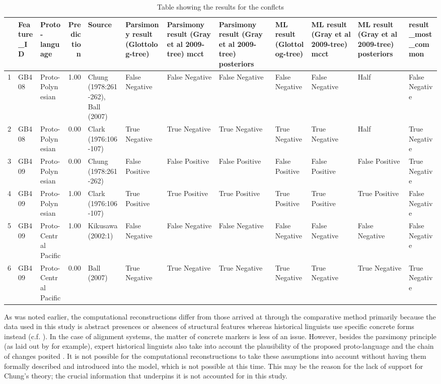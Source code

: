 \documentclass[a4paper,10pt]{article} %
\begin{document}
\begin{table}[ht]
\caption{Table showing the results for the conflcts}
\label{conflict_table}
\centering
\begin{tabular}{rllrllllllll}
  \hline
 & Feature\_ID & Proto-language & Prediction & Source & Parsimony result (Glottolog-tree) & Parsimony result (Gray et al 2009-tree) mcct & Parsimony result (Gray et al 2009-tree) posteriors & ML result (Glottolog-tree) & ML result (Gray et al 2009-tree) mcct & ML result (Gray et al 2009-tree) posteriors & result\_most\_common \\ 
  \hline
1 & GB408 & Proto-Polynesian & 1.00 & Chung (1978:261-262), Ball (2007) & False Negative & False Negative & False Negative & False Negative & False Negative & Half & False Negative \\ 
  2 & GB408 & Proto-Polynesian & 0.00 & Clark (1976:106-107) & True Negative & True Negative & True Negative & True Negative & True Negative & Half & True Negative \\ 
  3 & GB409 & Proto-Polynesian & 0.00 & Chung (1978:261-262) & False Positive & False Positive & False Positive & False Positive & False Positive & False Positive & True Negative \\ 
  4 & GB409 & Proto-Polynesian & 1.00 & Clark (1976:106-107) & True Positive & True Positive & True Positive & True Positive & True Positive & True Positive & False Negative \\ 
  5 & GB409 & Proto-Central Pacific & 1.00 & Kikusawa (2002:1) & False Negative & False Negative & False Negative & False Negative & False Negative & False Negative & False Negative \\ 
  6 & GB409 & Proto-Central Pacific & 0.00 & Ball (2007) & True Negative & True Negative & True Negative & True Negative & True Negative & True Negative & True Negative \\ 
   \hline
\end{tabular}
\end{table}


As was noted earlier, the computational reconstructions differ from those arrived at through the comparative method primarily because the data used in this study is abstract presences or absences of structural features whereas historical linguists use specific concrete forms instead (c.f. \citet{crowley1985common}). In the case of alignment systems, the matter of concrete markers is less of an issue. However, besides the parsimony principle (as laid out by \citet[19]{clark1976aspects} for example), expert historical linguists also take into account the plausibility of the proposed proto-language and the chain of changes posited \citep{chung1977aspects}. It is not possible for the computational reconstructions to take these assumptions into account without having them formally described and introduced into the model, which is not possible at this time. This may be the reason for the lack of support for Chung's theory; the crucial information that underpins it is not accounted for in this study.
\end{document}
